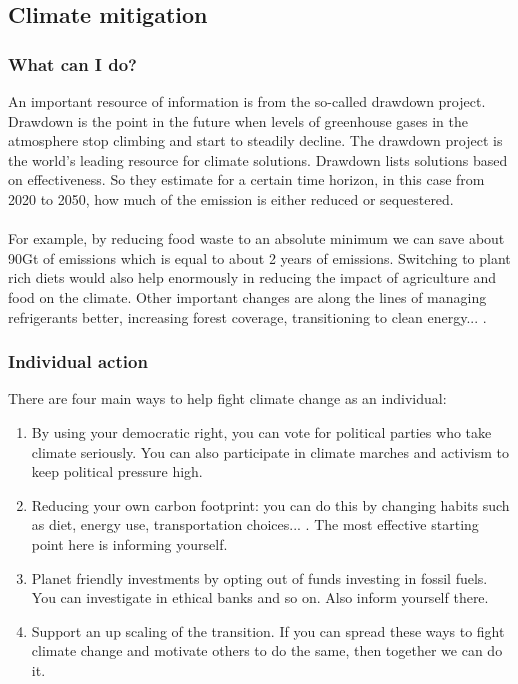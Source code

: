 \documentclass[../summary.tex]{subfiles}
\begin{document}
		\subsection{Climate mitigation}
			\subsubsection{What can I do?}
				An important resource of information is from the so-called drawdown project. Drawdown is the point in the future when levels of greenhouse gases in the atmosphere stop climbing and start to steadily decline. The drawdown project is the world's leading resource for climate solutions. Drawdown lists solutions based on effectiveness. So they estimate for a certain time horizon, in this case from 2020 to 2050, how much of the emission is either reduced or sequestered. \\
				\\
				For example, by reducing food waste to an absolute minimum we can save about 90Gt of emissions which is equal to about 2 years of emissions. Switching to plant rich diets would also help enormously in reducing the impact of agriculture and food on the climate. Other important changes are along the lines of managing refrigerants better, increasing forest coverage, transitioning to clean energy... .
				
			\subsubsection{Individual action} 
				There are four main ways to help fight climate change as an individual:
				\begin{enumerate}
					\item By using your democratic right, you can vote for political parties who take climate seriously. You can also participate in climate marches and activism to keep political pressure high. 
					\item Reducing your own carbon footprint: you can do this by changing habits such as diet, energy use, transportation choices... . The most effective starting point here is informing yourself. 
					\item Planet friendly investments by opting out of funds investing in fossil fuels. You can investigate in ethical banks and so on. Also inform yourself there.
					\item Support an up scaling of the transition. If you can spread these ways to fight climate change and motivate others to do the same, then together we can do it.
				\end{enumerate}
				
\end{document}
